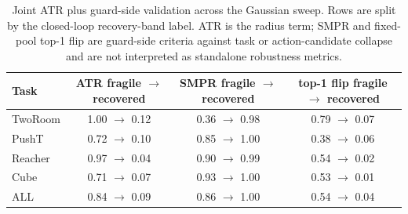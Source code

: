 \begin{table}[H]
\centering
\caption{Joint ATR plus guard-side validation across the Gaussian sweep. Rows are split by the closed-loop recovery-band label. ATR is the radius term; SMPR and fixed-pool top-1 flip are guard-side criteria against task or action-candidate collapse and are not interpreted as standalone robustness metrics.}
\label{tab:joint-guard-side-validation}
\small
\setlength{\tabcolsep}{4pt}
\begin{tabular}{lccc}
\toprule
Task & ATR fragile $\to$ recovered & SMPR fragile $\to$ recovered & top-1 flip fragile $\to$ recovered \\
\midrule
TwoRoom & 1.00 $\to$ 0.12 & 0.36 $\to$ 0.98 & 0.79 $\to$ 0.07 \\
PushT & 0.72 $\to$ 0.10 & 0.85 $\to$ 1.00 & 0.38 $\to$ 0.06 \\
Reacher & 0.97 $\to$ 0.04 & 0.90 $\to$ 0.99 & 0.54 $\to$ 0.02 \\
Cube & 0.71 $\to$ 0.07 & 0.93 $\to$ 1.00 & 0.53 $\to$ 0.01 \\
ALL & 0.84 $\to$ 0.09 & 0.86 $\to$ 1.00 & 0.54 $\to$ 0.04 \\
\bottomrule
\end{tabular}
\end{table}
